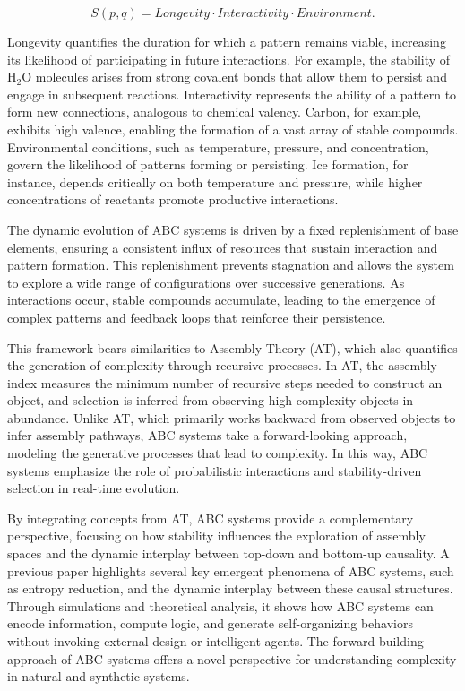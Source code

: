 \documentclass[entropy,article,submit,pdftex,oneauthor]{Definitions/mdpi}
\begin{document}
\[
S(p, q) = Longevity \cdot Interactivity \cdot Environment.
\]

Longevity quantifies the duration for which a pattern remains viable, increasing its likelihood of participating in future interactions. For example, the stability of \( \text{H}_2\text{O} \) molecules arises from strong covalent bonds that allow them to persist and engage in subsequent reactions. Interactivity represents the ability of a pattern to form new connections, analogous to chemical valency. Carbon, for example, exhibits high valence, enabling the formation of a vast array of stable compounds. Environmental conditions, such as temperature, pressure, and concentration, govern the likelihood of patterns forming or persisting. Ice formation, for instance, depends critically on both temperature and pressure, while higher concentrations of reactants promote productive interactions.

The dynamic evolution of ABC systems is driven by a fixed replenishment of base elements, ensuring a consistent influx of resources that sustain interaction and pattern formation. This replenishment prevents stagnation and allows the system to explore a wide range of configurations over successive generations. As interactions occur, stable compounds accumulate, leading to the emergence of complex patterns and feedback loops that reinforce their persistence.

This framework bears similarities to Assembly Theory (AT), which also quantifies the generation of complexity through recursive processes. In AT, the assembly index measures the minimum number of recursive steps needed to construct an object, and selection is inferred from observing high-complexity objects in abundance. Unlike AT, which primarily works backward from observed objects to infer assembly pathways, ABC systems take a forward-looking approach, modeling the generative processes that lead to complexity. In this way, ABC systems emphasize the role of probabilistic interactions and stability-driven selection in real-time evolution.

By integrating concepts from AT, ABC systems provide a complementary perspective, focusing on how stability influences the exploration of assembly spaces and the dynamic interplay between top-down and bottom-up causality. A previous paper \cite{adler2024howinfoevolves} highlights several key emergent phenomena of ABC systems, such as entropy reduction, and the dynamic interplay between these causal structures. Through simulations and theoretical analysis, it shows how ABC systems can encode information, compute logic, and generate self-organizing behaviors without invoking external design or intelligent agents. The forward-building approach of ABC systems offers a novel perspective for understanding complexity in natural and synthetic systems.
\end{document}
